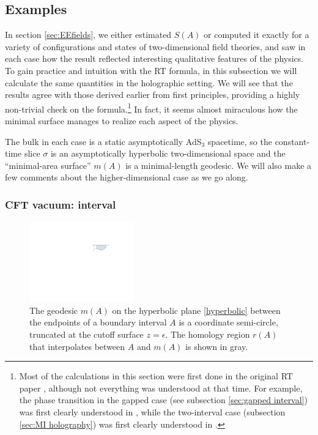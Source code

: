 \documentclass[11pt]{article}
\begin{document}
\subsection{Examples}
\label{sec:RT examples}

In section \ref{sec:EEfields}, we either estimated $S(A)$ or computed it exactly for a variety of configurations and states of two-dimensional field theories, and saw in each case how the result reflected interesting qualitative features of the physics. To gain practice and intuition with the RT formula, in this subsection we will calculate the same quantities in the holographic setting.  We will see that the results agree with those derived earlier from first principles, providing a highly non-trivial check on the formula.\footnote{Most of the calculations in this section were first done in the original RT paper \cite{Ryu:2006ef}, although not everything was understood at that time. For example, the phase transition in the gapped case (see subsection \ref{sec:gapped interval}) was first clearly understood in \cite{Klebanov:2007ws}, while the two-interval case (subsection \ref{sec:MI holography}) was first clearly understood in \cite{Headrick:2010zt}.} In fact, it seems almost miraculous how the minimal surface manages to realize each aspect of the physics.

The bulk in each case is a static asymptotically AdS$_3$ spacetime, so the constant-time slice $\sigma$ is an asymptotically hyperbolic two-dimensional space and the ``minimal-area surface'' $m(A)$ is a minimal-length geodesic. We will also make a few comments about the higher-dimensional case as we go along.



\subsubsection{CFT vacuum: interval}
\label{sec:vacuum line}

\begin{figure}[tbp]
\centering
\includegraphics[width=0.4\textwidth]{figs/vacuumdressed}
\caption{\label{fig:vacuumdressed}
The geodesic $m(A)$ on the hyperbolic plane \eqref{hyperbolic} between the endpoints of a boundary interval $A$ is a coordinate semi-circle, truncated at the cutoff surface $z=\epsilon$. The homology region $r(A)$ that interpolates between $A$ and $m(A)$ is shown in gray.
}
\end{figure}
\end{document}
